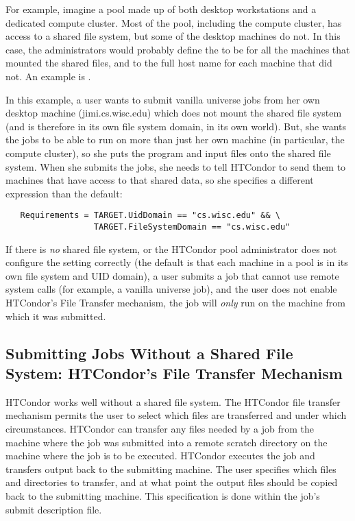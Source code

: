 For example, imagine a pool made up of both desktop workstations and a
dedicated compute cluster.
Most of the pool, including the compute cluster, has access to a
shared file system, but some of the desktop machines do not.
In this case, the administrators would probably define the
 to be  for all the machines
that mounted the shared files, and to the full host name for each
machine that did not. An example is .

In this example,
a user wants to submit vanilla universe jobs from her own desktop
machine (jimi.cs.wisc.edu) which does not mount the shared file system
(and is therefore in its own file system domain, in its own world).
But, she wants the jobs to be able to run on more than just her own
machine (in particular, the compute cluster), so she puts the program
and input files onto the shared file system.
When she submits the jobs, she needs to tell HTCondor to send them to
machines that have access to that shared data, so she specifies a
different  expression than the default:
\begin{verbatim}
   Requirements = TARGET.UidDomain == "cs.wisc.edu" && \
                  TARGET.FileSystemDomain == "cs.wisc.edu"
\end{verbatim}

\Warn If there is \emph{no} shared file system, or the HTCondor pool
administrator does not configure the \AdAttr{FileSystemDomain}
setting correctly (the default is that each machine in a pool is in
its own file system and UID domain), a user submits a job that cannot
use remote system calls (for example, a vanilla universe job), and the
user does not enable HTCondor's File Transfer mechanism, the job will
\emph{only} run on the machine from which it was submitted.


\subsection{\label{sec:file-transfer}
Submitting Jobs Without a Shared File System:
HTCondor's File Transfer Mechanism} 


HTCondor works well without a shared file system.
The HTCondor file transfer mechanism permits the user to select which files are
transferred and under which circumstances.
HTCondor can transfer any files needed by a job from
the machine where the job was submitted into a
remote scratch directory on the machine where the
job is to be executed.
HTCondor executes the job
and transfers output back to the submitting machine.
The user specifies which files and directories to transfer,
and at what point the output files should be copied back to the
submitting machine.
This specification is done within the job's submit description file.



